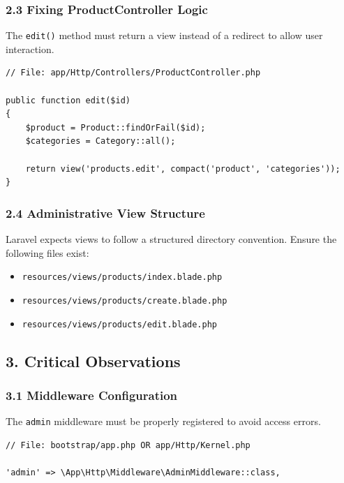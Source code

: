 \documentclass[12pt,a4paper]{article}
\begin{document}
\subsubsection{2.3 Fixing ProductController Logic}

The \texttt{edit()} method must return a view instead of a redirect to allow user interaction.

\begin{verbatim}
// File: app/Http/Controllers/ProductController.php

public function edit($id)
{
    $product = Product::findOrFail($id);
    $categories = Category::all();

    return view('products.edit', compact('product', 'categories'));
}
\end{verbatim}

\subsubsection{2.4 Administrative View Structure}

Laravel expects views to follow a structured directory convention. Ensure the following files exist:

\begin{itemize}[noitemsep]
    \item \texttt{resources/views/products/index.blade.php}
    \item \texttt{resources/views/products/create.blade.php}
    \item \texttt{resources/views/products/edit.blade.php}
\end{itemize}

\subsection{3. Critical Observations}

\subsubsection{3.1 Middleware Configuration}

The \texttt{admin} middleware must be properly registered to avoid access errors.

\begin{verbatim}
// File: bootstrap/app.php OR app/Http/Kernel.php

'admin' => \App\Http\Middleware\AdminMiddleware::class,
\end{verbatim}
\end{document}
